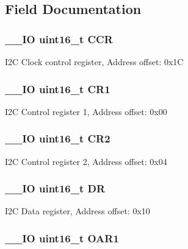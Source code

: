 \subsection{Field Documentation}
\hypertarget{struct_i2_c___type_def_a7ac198788f460fa6379bceecab79c5f7}{
\subsubsection[{C\-C\-R}]{\setlength{\rightskip}{0pt plus 5cm}\-\_\-\-\_\-\-I\-O uint16\-\_\-t C\-C\-R}}\label{struct_i2_c___type_def_a7ac198788f460fa6379bceecab79c5f7}
I2\-C Clock control register, Address offset\-: 0x1\-C \hypertarget{struct_i2_c___type_def_a61400ce239355b62aa25c95fcc18a5e1}{
\subsubsection[{C\-R1}]{\setlength{\rightskip}{0pt plus 5cm}\-\_\-\-\_\-\-I\-O uint16\-\_\-t C\-R1}}\label{struct_i2_c___type_def_a61400ce239355b62aa25c95fcc18a5e1}
I2\-C Control register 1, Address offset\-: 0x00 \hypertarget{struct_i2_c___type_def_a2a3e81bd118d1bc52d24a0b0772e6a0c}{
\subsubsection[{C\-R2}]{\setlength{\rightskip}{0pt plus 5cm}\-\_\-\-\_\-\-I\-O uint16\-\_\-t C\-R2}}\label{struct_i2_c___type_def_a2a3e81bd118d1bc52d24a0b0772e6a0c}
I2\-C Control register 2, Address offset\-: 0x04 \hypertarget{struct_i2_c___type_def_a0a1acc0425516ff7969709d118b96a3b}{
\subsubsection[{D\-R}]{\setlength{\rightskip}{0pt plus 5cm}\-\_\-\-\_\-\-I\-O uint16\-\_\-t D\-R}}\label{struct_i2_c___type_def_a0a1acc0425516ff7969709d118b96a3b}
I2\-C Data register, Address offset\-: 0x10 \hypertarget{struct_i2_c___type_def_aaab934113da0a8bcacd1ffa148046569}{
\subsubsection[{O\-A\-R1}]{\setlength{\rightskip}{0pt plus 5cm}\-\_\-\-\_\-\-I\-O uint16\-\_\-t O\-A\-R1}}\label{struct_i2_c___type_def_aaab934113da0a8bcacd1ffa148046569}
